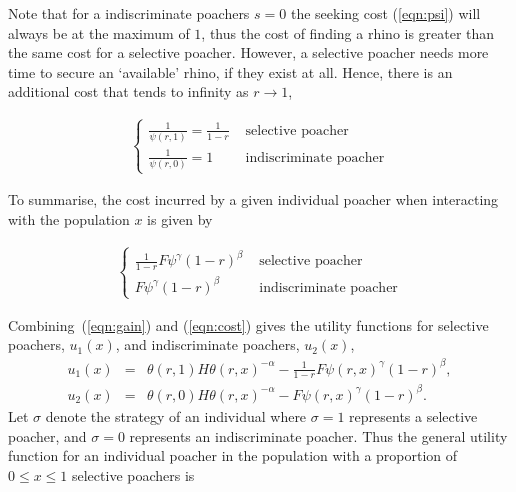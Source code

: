 \documentclass[10pt]{article}
\begin{document}
Note that for a indiscriminate poachers \(s = 0\) the seeking 
cost (\ref{eqn:psi}) will always be at the maximum of \(1\), thus the cost of finding a rhino is greater
than the same cost for a selective poacher. However, a selective poacher needs 
more time to secure an `available' rhino, if they exist at all. Hence, there is an 
additional cost that tends to infinity as \(r \rightarrow 1\), 

\begin{eqnarray}
    \label{eqn:selective_cost}
    \left\{
    \begin{array}{cl}
    \frac{1}{\psi(r, 1)} = \frac{1}{1 - r} & \mbox{ selective poacher}
    \\
    \frac{1}{\psi(r, 0)} = 1 & \mbox{ indiscriminate poacher}
    \end{array} \right.
\end{eqnarray}

To summarise, the cost incurred by a given individual poacher when interacting with
the population $x$ is given by 

\begin{eqnarray}
    \label{eqn:cost}
    \left\{
    \begin{array}{cl}
    \frac{1}{1 - r}  F\psi^{\gamma} (1-r)^{\beta}& \mbox{ selective poacher}
    \\
    F\psi^{\gamma} (1-r)^{\beta}& \mbox{ indiscriminate poacher}
    \end{array} \right.
\end{eqnarray}

Combining~(\ref{eqn:gain}) and (\ref{eqn:cost}) gives the utility functions for selective poachers, $u_1(x)$, and indiscriminate poachers, $u_2(x)$, 
\begin{eqnarray} %
\label{eqn:USchi}
u_1(x) &=& \theta(r,1) H \theta(r,x)^{-\alpha}
- \frac{1}{1- r} F\psi(r, x)^{\gamma} (1-r)^{\beta} ,
\\
\label{eqn:UnotSchi}
u_2(x) &=& \theta(r,0) H \theta(r,x)^{-\alpha}
- F\psi(r, x)^{\gamma}  (1-r)^{\beta}.
\end{eqnarray}
Let $\sigma$ denote the strategy of an individual where $\sigma =1$ represents a selective poacher, and $\sigma=0$ represents an indiscriminate poacher. Thus the general utility function for an individual poacher in the population with a proportion of $0 \leq x \leq 1$ selective poachers is
\end{document}
